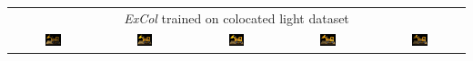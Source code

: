 \begingroup
\begin{table}[!htb]
    \centering
    \setlength\tabcolsep{2pt}
    \begin{tabular*}{\textwidth}{ c c c c c }
        \multicolumn{5}{c}{\textit{ExCol} trained on colocated light dataset} \\
          \includegraphics[width=0.19\textwidth]{figures/results/arb_set/dynamic_light/excol_col_vc0_ld-60.png}
        & \includegraphics[width=0.19\textwidth]{figures/results/arb_set/dynamic_light/excol_col_vc0_ld-30.png}
        & \includegraphics[width=0.19\textwidth]{figures/results/arb_set/dynamic_light/excol_col_vc0_ld0.png}
        & \includegraphics[width=0.19\textwidth]{figures/results/arb_set/dynamic_light/excol_col_vc0_ld30.png} 
        & \includegraphics[width=0.19\textwidth]{figures/results/arb_set/dynamic_light/excol_col_vc0_ld60.png} \\
        

\end{tabular*}
\end{table}
